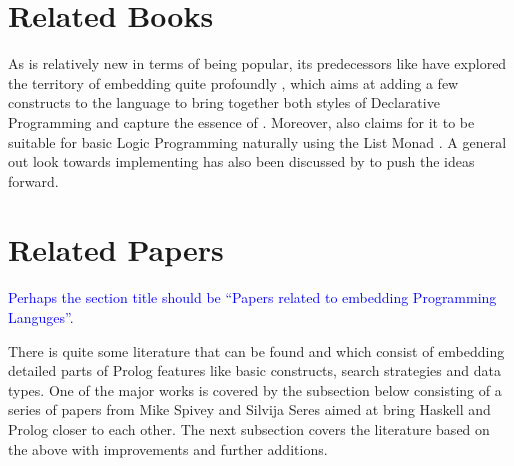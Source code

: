 \documentclass[thesis-solanki.tex]{subfiles}
\begin{document}
\section{Related Books}

As  is relatively new in terms of being popular, its predecessors like  have
explored the territory of embedding  quite profoundly \cite{friedman05reasoned}, which aims at adding a few
constructs to the language to bring together both styles of Declarative Programming and capture the essence of
.
Moreover,  also claims for it to be suitable for basic Logic Programming naturally using the List
Monad \cite{website:logicprogexamplehaskell}.
A general out look towards implementing  has also been discussed by
\cite{krishnamurthi2007programming} to push the ideas forward.

\begin{comment}
All the more \textit{Prologish} things exist in Haskell, as mentioned alone it is not the only one if we consider it in the ''Scheme'' \cite{friedman05reasoned} of things and so is replication to other languages \cite{krishnamurthi2007programming}.
\end{comment}

\begin{comment}
\begin{enumerate}
\item The Reasoned Schemer, Daniel P. Friedman, William E. Byrd, Oleg Kiselyov

\item Programming Languages: Application and Interpretation, Shriram Krishnamurthi,
\\*  Chapters 33-34 of PLAI discuss Prolog and implementing Prolog

\end{enumerate}
\end{comment}

\section{Related Papers}
\textcolor{blue}{Perhaps the section title should be ``Papers related to embedding Programming Languges''.}

There is quite some literature
that can be found and which consist of embedding detailed parts of Prolog features
like basic constructs, search strategies and data types.
One of the major works is covered by the subsection below consisting of a series of papers from Mike Spivey and
Silvija Seres aimed at bring Haskell and Prolog closer to each other.
The next subsection covers the literature based on the above with improvements and further additions.
\end{document}

